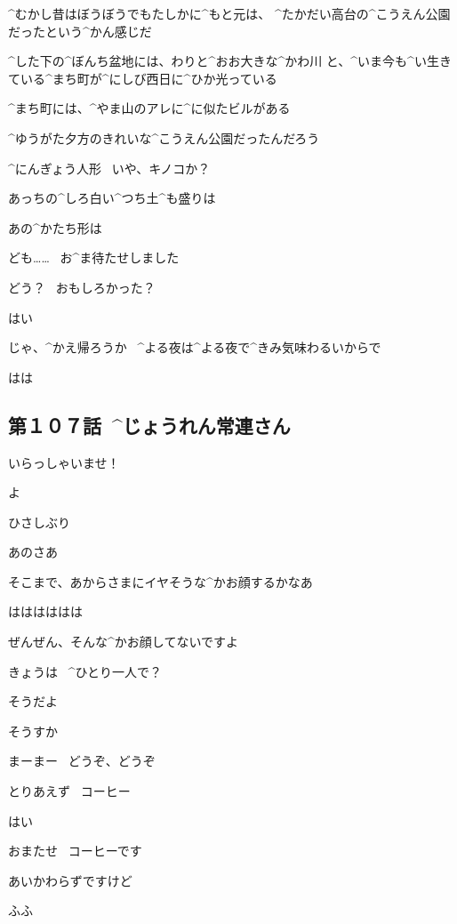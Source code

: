 \page
\Ayase ^{むかし}{昔}はぼうぼうでもたしかに^{もと}{元}は、
^{たかだい}{高台}の^{こうえん}{公園}だったという^{かん}{感}じだ

\Ayase ^{した}{下}の^{ぼんち}{盆地}には、わりと^{おお}{大}きな^{かわ}{川}
と、^{いま}{今}も^{い}{生}きている^{まち}{町}が^{にしび}{西日}に^{ひか}{光}っている

\Ayase ^{まち}{町}には、^{やま}{山}のアレに^{に}{似}たビルがある

\Ayase ^{ゆうがた}{夕方}のきれいな^{こうえん}{公園}だったんだろう

\page[97]
\Ayase ^{にんぎょう}{人形}
\ いや、キノコか？

\Ayase あっちの^{しろ}{白}い^{つち}{土}^{も}{盛}りは

\Takahiro あの^{かたち}{形}は

\page
\Ayase ども……
\ お^{ま}{待}たせしました

\Person どう？
\ おもしろかった？

\Ayase はい

\Person じゃ、^{かえ}{帰}ろうか
\ ^{よる}{夜}は^{よる}{夜}で^{きみ}{気味}わるいからで

\Ayase はは


\subsection{第１０７話\ ^{じょうれん}{常連}さん}

\page[103]
\Alpha いらっしゃいませ！

\page
\Maruko よ

\Alpha ひさしぶり

\Maruko あのさあ

\Maruko そこまで、あからさまにイヤそうな^{かお}{顔}するかなあ

\Alpha はははははは

\Alpha ぜんぜん、そんな^{かお}{顔}してないですよ

\page
\Alpha きょうは
\ ^{ひとり}{一人}で？

\Maruko そうだよ

\Alpha そうすか

\Alpha まーまー
\ どうぞ、どうぞ

\Maruko とりあえず
\ コーヒー

\Alpha はい

\page[107]
\Alpha おまたせ
\ コーヒーです

\Alpha あいかわらずですけど

\page
\Maruko ふふ

